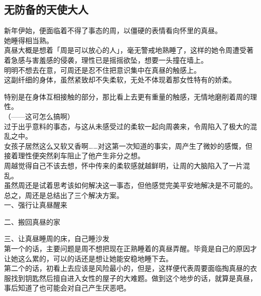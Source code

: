 \subsection{无防备的天使大人}

新年伊始，便面临着不得了事态的周，以僵硬的表情看向怀里的真昼。\\

她睡得相当熟。\\

真昼大概是想着「周是可以放心的人」，毫无警戒地熟睡了，这样的她令周遭受著着急感与害羞感的侵袭，理性已是摇摇欲坠，想要一头撞在墙上。\\

明明不想去在意，可周还是忍不住把意识集中在真昼的触感上。\\

这副纤细的身体，虽然紧致却不失柔软，无处不体现着那女性特有的娇柔。

特别是在身体互相接触的部分，那比看上去更有重量的触感，无情地磨削着周的理性。\\

（——这可怎么搞啊）\\

过于出乎意料的事态，与这从未感受过的柔软一起向周袭来，令周陷入了极大的混乱之中。\\

女孩子居然这么又软又香啊……对这第一次知道的事实，周产生了微妙的感慨，但接着理性便突然刹车阻止了他产生非分之想。\\

周越觉得自己不该去想，怀中传来的柔软感就越鲜明，让周的大脑陷入了一片混乱。\\

虽然周还是试着思考该如何解决这一事态，但他感觉完美平安地解决是不可能的。\\

总之，周还是总结出了三个解决方案。\\

一、强行让真昼醒来

二、搬回真昼的家

三、让真昼睡周的床，自己睡沙发\\

第一个的话，主要问题是周不想把现在正熟睡着的真昼弄醒。毕竟是自己的原因才让她这么累的，可以的话还是想让她能安稳地睡下去。\\

第二个的话，初看上去应该是风险最小的，但是，这样便代表周要面临掏真昼的衣服找到钥匙然后擅自进入女性的屋子的大难题。做到这个地步的话，就算是真昼，事后知道了也可能会对自己产生厌恶吧。\\

